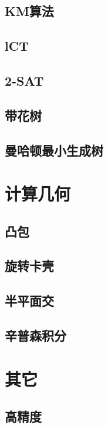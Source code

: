 \documentclass[UTF8,a4paper]{ctexart}
\begin{document}
\subsection{KM算法}

\subsection{lCT}

\subsection{2-SAT}

\subsection{带花树}

\subsection{曼哈顿最小生成树}

\section{计算几何}

\subsection{凸包}

\subsection{旋转卡壳}

\subsection{半平面交}

\subsection{辛普森积分}

\section{其它}

\subsection{高精度}

\maketitle 
\end{document}
